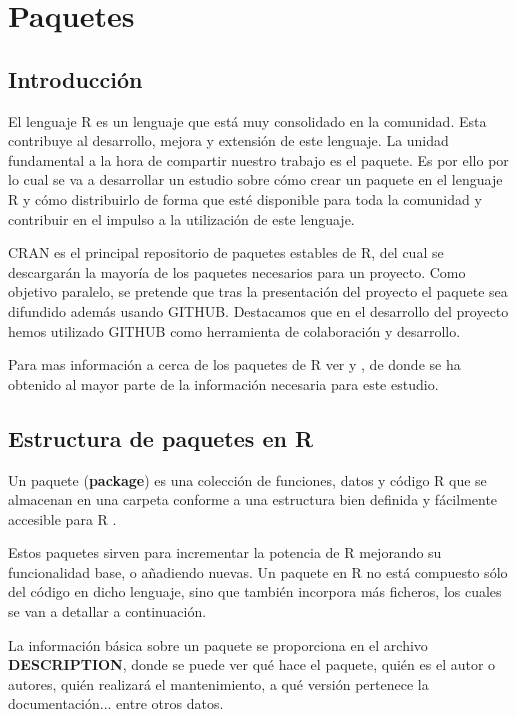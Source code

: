 \section{Paquetes}
\subsection{Introducci\'on}


El lenguaje R es un lenguaje que est\'a muy consolidado en la comunidad. Esta contribuye al desarrollo, mejora y extensi\'on de este lenguaje. La unidad fundamental a la hora de compartir 
nuestro trabajo es el paquete. Es por ello por lo cual se va a desarrollar un estudio sobre c\'omo crear un paquete en el lenguaje R y c\'omo distribuirlo de forma que est\'e disponible para toda la comunidad y contribuir en el impulso a la utilizaci\'on de este lenguaje.

CRAN es el principal repositorio de paquetes estables de R, del cual se descargar\'an la mayor\'ia de los paquetes necesarios para un proyecto. Como objetivo paralelo, se pretende que tras la presentaci\'on del proyecto el paquete sea difundido adem\'as usando GITHUB.  Destacamos que en el desarrollo del proyecto hemos utilizado GITHUB como herramienta de colaboraci\'on y desarrollo. 

Para mas informaci\'on a cerca de los paquetes de R ver \cite{rcore} y \cite{book}, de donde se ha obtenido al mayor parte de la informaci\'on necesaria para este estudio.
\subsection{Estructura de paquetes en R}

Un paquete (\textbf{package}) es una colecci\'on de funciones, datos y c\'odigo R que se almacenan en una carpeta 
conforme a una estructura bien definida y f\'acilmente accesible para R \cite{librR}.

Estos paquetes sirven para incrementar la potencia de R mejorando su funcionalidad base, o a\~nadiendo 
nuevas.
Un paquete en R no est\'a compuesto s\'olo del c\'odigo en dicho lenguaje, sino que tambi\'en incorpora m\'as ficheros, 
los cuales se van a detallar a continuaci\'on.\cite{rParaTodos}

La informaci\'on b\'asica sobre un paquete se proporciona en el archivo \textbf{DESCRIPTION}, donde se puede ver qu\'e hace 
el paquete, qui\'en es el autor o autores, qui\'en realizar\'a el mantenimiento, a qu\'e versi\'on pertenece la documentaci\'on... entre otros datos.

